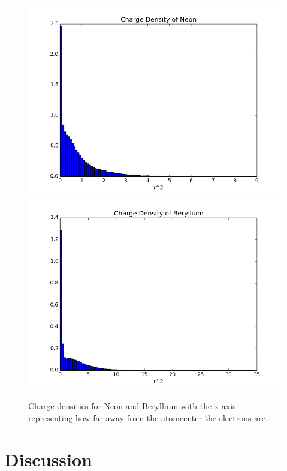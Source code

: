 \documentclass[11pt]{article}
\begin{document}
		\begin{figure}
			\centering \includegraphics[width=0.45\linewidth]{../figures/ChargeDensityNeon}
			\centering \includegraphics[width=0.45\linewidth]{../figures/ChargeDensityBeryllium}
			\protect\caption{Charge densities for Neon and Beryllium with the x-axis representing how far away from the atomcenter the electrons are. }
			\label{fig:charge_density}
		\end{figure}

\section{Discussion}






\end{document}
